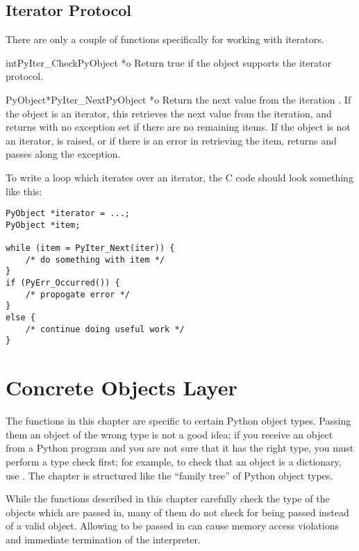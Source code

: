 \documentclass{manual}
\begin{document}
\section{Iterator Protocol \label{iterator}}


There are only a couple of functions specifically for working with
iterators.

\begin{cfuncdesc}{int}{PyIter_Check}{PyObject *o}
  Return true if the object  supports the iterator protocol.
\end{cfuncdesc}

\begin{cfuncdesc}{PyObject*}{PyIter_Next}{PyObject *o}
  Return the next value from the iteration .  If the object is
  an iterator, this retrieves the next value from the iteration, and
  returns \NULL{} with no exception set if there are no remaining
  items.  If the object is not an iterator,  is
  raised, or if there is an error in retrieving the item, returns
  \NULL{} and passes along the exception.
\end{cfuncdesc}

To write a loop which iterates over an iterator, the C code should
look something like this:

\begin{verbatim}
PyObject *iterator = ...;
PyObject *item;

while (item = PyIter_Next(iter)) {
    /* do something with item */
}
if (PyErr_Occurred()) {
    /* propogate error */
}
else {
    /* continue doing useful work */
}
\end{verbatim}


\chapter{Concrete Objects Layer \label{concrete}}

The functions in this chapter are specific to certain Python object
types.  Passing them an object of the wrong type is not a good idea;
if you receive an object from a Python program and you are not sure
that it has the right type, you must perform a type check first;
for example, to check that an object is a dictionary, use
.  The chapter is structured like the
``family tree'' of Python object types.

While the functions described in this chapter carefully check the type
of the objects which are passed in, many of them do not check for
\NULL{} being passed instead of a valid object.  Allowing \NULL{} to
be passed in can cause memory access violations and immediate
termination of the interpreter.
\end{document}

